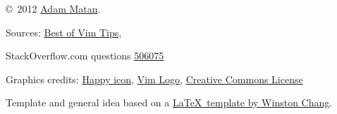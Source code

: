\documentclass[10pt,landscape]{article}
\begin{document}
\begin{multicols}{3}
{\copyright\ 2012 \href{http://matan.name}{Adam Matan}.}

\begin{tiny}
Sources: \href{http://rayninfo.co.uk/vimtips.html}{Best of Vim Tips},

StackOverflow.com questions \href{http://stackoverflow.com/questions/506075/how-do-i-fix-the-indentation-of-an-entire-file-in-vi}{506075}

Graphics credits: 	\href{http://commons.wikimedia.org/wiki/File:Gnome-face-smile.svg}	{Happy icon},
					\href{http://en.wikipedia.org/wiki/File:Vimlogo.svg}				{Vim Logo},
					\href{http://creativecommons.org/about/downloads}					{Creative Commons License}



Template and general idea based on a \href{http://www.stdout.org/~winston/latex/}{\LaTeX\ template by Winston Chang}.
\end{tiny}




\end{multicols}
\end{document}
